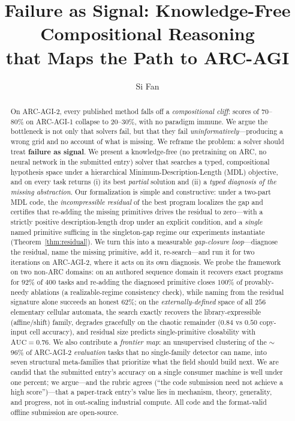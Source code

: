 \documentclass[11pt]{article}
\title{\textbf{Failure as Signal: Knowledge-Free Compositional Reasoning\\ that Maps the Path to ARC-AGI}}
\author{Si Fan}
\date{}
\begin{document}
\maketitle

\begin{abstract}
On ARC-AGI-2, every published method falls off a \emph{compositional cliff}: scores of 70--80\% on
ARC-AGI-1 collapse to 20--30\%, with no paradigm immune. We argue the bottleneck is not only that solvers
fail, but that they fail \emph{uninformatively}---producing a wrong grid and no account of what is missing.
We reframe the problem: a solver should treat \textbf{failure as signal}. We present a knowledge-free
(no pretraining on ARC, no neural network in the submitted entry) solver that searches a typed, compositional
hypothesis space under a hierarchical Minimum-Description-Length (MDL) objective, and on every task returns
(i) its best \emph{partial} solution and (ii) a \emph{typed diagnosis of the missing abstraction}. Our
formalization is simple and constructive: under a two-part MDL code, the \emph{incompressible residual} of the
best program localizes the gap and certifies that re-adding the missing primitives drives the residual to
zero---with a strictly positive description-length drop under an explicit condition, and a \emph{single}
named primitive sufficing in the singleton-gap regime our experiments instantiate
(Theorem~\ref{thm:residual}).
We turn this into a measurable \emph{gap-closure loop}---diagnose the residual, name the missing primitive,
add it, re-search---and run it for two iterations on ARC-AGI-2, where it acts on its own diagnosis. We probe
the framework on two non-ARC domains: on an authored sequence domain it recovers exact programs for $92\%$ of
$400$ tasks and re-adding the diagnosed primitive closes $100\%$ of provably-needy ablations (a
realizable-regime consistency check), while naming from the residual signature alone succeeds an honest
$62\%$; on the \emph{externally-defined} space of all $256$ elementary cellular automata, the search exactly
recovers the library-expressible (affine/shift) family, degrades gracefully on the chaotic remainder ($0.84$
vs $0.50$ copy-input cell accuracy), and residual size predicts single-primitive closability with
$\mathrm{AUC}=0.76$. We also contribute a \emph{frontier map}: an unsupervised
clustering of the $\sim$96\% of ARC-AGI-2 \emph{evaluation} tasks that no single-family detector can name,
into seven structural meta-families that prioritize what the field should build next. We are candid that the
submitted entry's accuracy on a single consumer machine is well under one percent; we argue---and the rubric
agrees (``the code submission need not achieve a high score'')---that a paper-track entry's value lies in
mechanism, theory, generality, and progress, not in out-scaling industrial compute. All code and the
format-valid offline submission are open-source.
\end{abstract}
\end{document}
